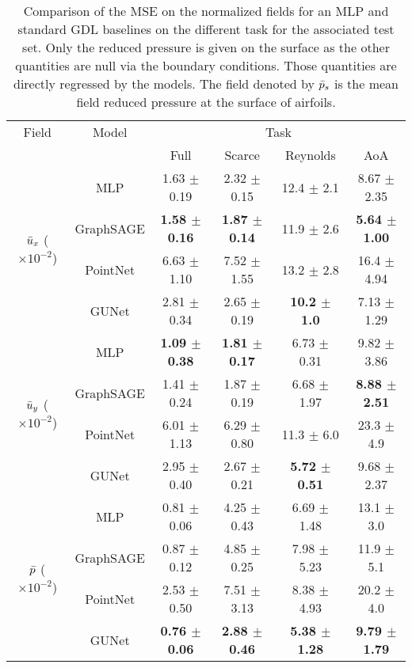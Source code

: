 \begin{table}
	\caption[Comparison of the \acrshort{MSE} on the normalized fields.]{Comparison of the \acrshort{MSE} on the normalized fields for an \acrshort{MLP} and standard \acrshort{GDL} baselines on the different task for the associated test set. Only the reduced pressure is given on the surface as the other quantities are null via the boundary conditions. Those quantities are directly regressed by the models. The field denoted by $\Bar{p}_s$ is the mean field reduced pressure at the surface of airfoils.}
	\label{tab:MSE_comparison_corr}
	\centering
	\begin{tabular}{cccccc}
		\toprule
		Field & Model & \multicolumn{4}{c}{Task}  \\
		& & Full & Scarce & Reynolds & AoA \\
		\midrule
		\multirow{4}{*}{$\Bar{u}_x$ ($\times 10^{-2}$)} & MLP & 1.63 $\pm$ 0.19 & 2.32 $\pm$ 0.15 & 12.4 $\pm$ 2.1 & 8.67 $\pm$ 2.35 \\
		& GraphSAGE & \textbf{1.58 $\pm$ 0.16} & \textbf{1.87 $\pm$ 0.14} & 11.9 $\pm$ 2.6 & \textbf{5.64 $\pm$ 1.00} \\
		& PointNet & 6.63 $\pm$ 1.10 & 7.52 $\pm$ 1.55 & 13.2 $\pm$ 2.8 & 16.4 $\pm$ 4.94 \\
		& GUNet & 2.81 $\pm$ 0.34 & 2.65 $\pm$ 0.19 & \textbf{10.2 $\pm$ 1.0} & 7.13 $\pm$ 1.29 \\
		\midrule
		\multirow{4}{*}{$\Bar{u}_y$ ($\times 10^{-2}$)} & MLP & \textbf{1.09 $\pm$ 0.38} & \textbf{1.81 $\pm$ 0.17} & 6.73 $\pm$ 0.31 & 9.82 $\pm$ 3.86 \\
		& GraphSAGE & 1.41 $\pm$ 0.24 & 1.87 $\pm$ 0.19 & 6.68 $\pm$ 1.97 & \textbf{8.88 $\pm$ 2.51} \\
		& PointNet & 6.01 $\pm$ 1.13 & 6.29 $\pm$ 0.80 & 11.3 $\pm$ 6.0 & 23.3 $\pm$ 4.9 \\
		& GUNet & 2.95 $\pm$ 0.40 & 2.67 $\pm$ 0.21 & \textbf{5.72 $\pm$ 0.51} & 9.68 $\pm$ 2.37 \\
		\midrule
		\multirow{4}{*}{$\Bar{p}$ ($\times 10^{-2}$)} & MLP & 0.81 $\pm$ 0.06 & 4.25 $\pm$ 0.43 & 6.69 $\pm$ 1.48 & 13.1 $\pm$ 3.0 \\
		& GraphSAGE & 0.87 $\pm$ 0.12 & 4.85 $\pm$ 0.25 & 7.98 $\pm$ 5.23 & 11.9 $\pm$ 5.1 \\
		& PointNet & 2.53 $\pm$ 0.50 & 7.51 $\pm$ 3.13 & 8.38 $\pm$ 4.93 & 20.2 $\pm$ 4.0 \\
		& GUNet & \textbf{0.76 $\pm$ 0.06} & \textbf{2.88 $\pm$ 0.46} & \textbf{5.38 $\pm$ 1.28} & \textbf{9.79 $\pm$ 1.79} \\

\end{tabular}
\end{table}
